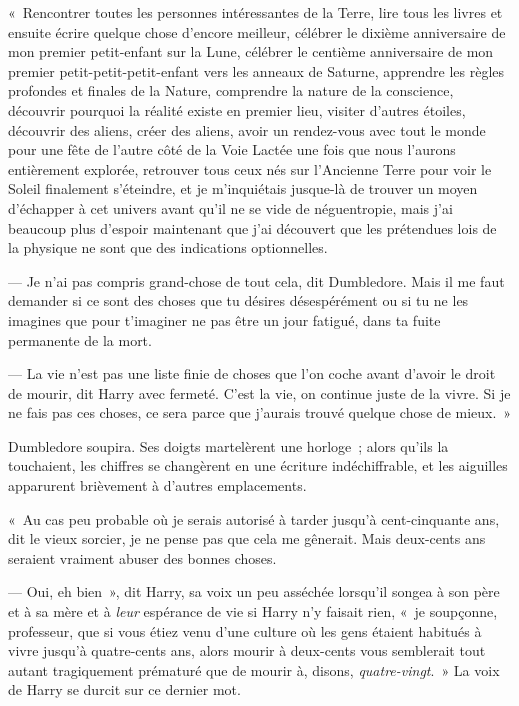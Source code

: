 «~Rencontrer toutes les personnes intéressantes de la Terre, lire tous les livres et ensuite écrire quelque chose d'encore meilleur, célébrer le dixième anniversaire de mon premier petit-enfant sur la Lune, célébrer le centième anniversaire de mon premier petit-petit-petit-enfant vers les anneaux de Saturne, apprendre les règles profondes et finales de la Nature, comprendre la nature de la conscience, découvrir pourquoi la réalité existe en premier lieu, visiter d'autres étoiles, découvrir des aliens, créer des aliens, avoir un rendez-vous avec tout le monde pour une fête de l'autre côté de la Voie Lactée une fois que nous l'aurons entièrement explorée, retrouver tous ceux nés sur l'Ancienne Terre pour voir le Soleil finalement s'éteindre, et je m'inquiétais jusque-là de trouver un moyen d'échapper à cet univers avant qu'il ne se vide de néguentropie, mais j'ai beaucoup plus d'espoir maintenant que j'ai découvert que les prétendues lois de la physique ne sont que des indications optionnelles.

--- Je n'ai pas compris grand-chose de tout cela, dit Dumbledore. Mais il me faut demander si ce sont des choses que tu désires désespérément ou si tu ne les imagines que pour t'imaginer ne pas être un jour fatigué, dans ta fuite permanente de la mort.

--- La vie n'est pas une liste finie de choses que l'on coche avant d'avoir le droit de mourir, dit Harry avec fermeté. C'est la vie, on continue juste de la vivre. Si je ne fais pas ces choses, ce sera parce que j'aurais trouvé quelque chose de mieux.~»

Dumbledore soupira. Ses doigts martelèrent une horloge~; alors qu'ils la touchaient, les chiffres se changèrent en une écriture indéchiffrable, et les aiguilles apparurent brièvement à d'autres emplacements.

«~Au cas peu probable où je serais autorisé à tarder jusqu'à cent-cinquante ans, dit le vieux sorcier, je ne pense pas que cela me gênerait. Mais deux-cents ans seraient vraiment abuser des bonnes choses.

--- Oui, eh bien~», dit Harry, sa voix un peu asséchée lorsqu'il songea à son père et à sa mère et à \emph{leur} espérance de vie si Harry n'y faisait rien, «~je soupçonne, professeur, que si vous étiez venu d'une culture où les gens étaient habitués à vivre jusqu'à quatre-cents ans, alors mourir à deux-cents vous semblerait tout autant tragiquement prématuré que de mourir à, disons, \emph{quatre-vingt}.~» La voix de Harry se durcit sur ce dernier mot.

